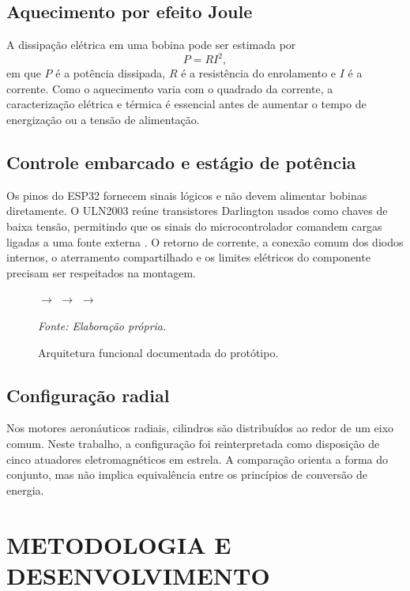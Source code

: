 \documentclass[12pt,a4paper,oneside]{article}
\newcommand{\source}[1]{\par\centering\footnotesize\itshape Fonte: #1\par}
\begin{document}
\subsection{Aquecimento por efeito Joule}

A dissipação elétrica em uma bobina pode ser estimada por
\begin{equation}
  P = R I^2,
\end{equation}
em que $P$ é a potência dissipada, $R$ é a resistência do enrolamento e $I$ é a corrente. Como o aquecimento varia com o quadrado da corrente, a caracterização elétrica e térmica é essencial antes de aumentar o tempo de energização ou a tensão de alimentação.

\subsection{Controle embarcado e estágio de potência}

Os pinos do ESP32 fornecem sinais lógicos e não devem alimentar bobinas diretamente. O ULN2003 reúne transistores Darlington usados como chaves de baixa tensão, permitindo que os sinais do microcontrolador comandem cargas ligadas a uma fonte externa \cite{tiuln}. O retorno de corrente, a conexão comum dos diodos internos, o aterramento compartilhado e os limites elétricos do componente precisam ser respeitados na montagem.

\begin{figure}[H]
  \centering
  \setlength{\fboxsep}{8pt}
  $\longrightarrow$
  $\longrightarrow$
  $\longrightarrow$
  \caption{Arquitetura funcional documentada do protótipo.}
  \source{Elaboração própria.}
\end{figure}

\subsection{Configuração radial}

Nos motores aeronáuticos radiais, cilindros são distribuídos ao redor de um eixo comum. Neste trabalho, a configuração foi reinterpretada como disposição de cinco atuadores eletromagnéticos em estrela. A comparação orienta a forma do conjunto, mas não implica equivalência entre os princípios de conversão de energia.

\section{METODOLOGIA E DESENVOLVIMENTO}
\end{document}

